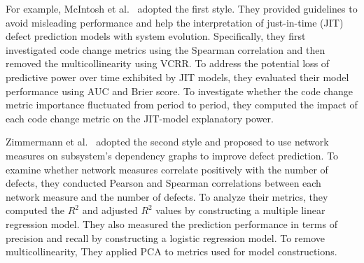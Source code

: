 For example, McIntosh et al.~\cite{McIntosh2017TSELongitudinal} adopted the first style. 
They provided guidelines to avoid misleading performance and help the interpretation of just-in-time (JIT) defect prediction models with system evolution.
Specifically, they first investigated code change metrics using the Spearman correlation and then removed the multicollinearity using VCRR.
To address the potential loss of predictive power over time exhibited by JIT models, they evaluated their model performance using AUC and Brier score. To investigate whether the code change metric importance fluctuated from period to period, they computed the impact of each code change metric on the JIT-model explanatory power.

Zimmermann et al.~\cite{Zimmermann2008ICSEnetwork} adopted the second style and proposed to use network measures on subsystem's dependency graphs to improve defect prediction. %
To examine whether network measures correlate positively with the number of defects, they conducted Pearson and Spearman correlations between each network measure and the number of defects. 
To analyze their metrics, they computed the $R^{2}$ and adjusted $R^{2}$ values by constructing a multiple linear regression model. 
They also measured the prediction performance in terms of precision and recall by constructing a logistic regression model.
To remove multicollinearity, They applied PCA to metrics used for model constructions.



